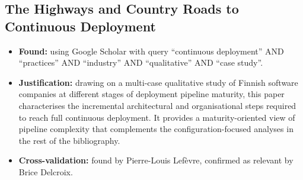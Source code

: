 \documentclass[a4paper,11pt,oneside]{article}
\begin{document}
\subsection{The Highways and Country Roads to Continuous Deployment \cite{Leppanen2015}}
%
\begin{itemize}
    \item \textbf{Found:} using Google Scholar with query ``continuous deployment'' AND ``practices'' AND ``industry'' AND ``qualitative'' AND ``case study''.
    \item \textbf{Justification:} drawing on a multi-case qualitative study of Finnish software companies at different stages of deployment pipeline maturity, this paper characterises the incremental architectural and organisational steps required to reach full continuous deployment. It provides a maturity-oriented view of pipeline complexity that complements the configuration-focused analyses in the rest of the bibliography.
    \item \textbf{Cross-validation:} found by Pierre-Louis Lef\`{e}vre, confirmed as relevant by Brice Delcroix.
\end{itemize}



\end{document}
